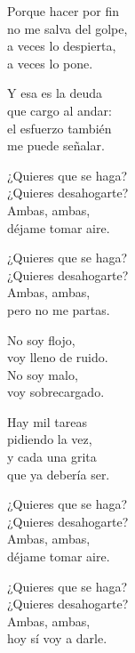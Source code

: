 \begin{lyrics}
Porque hacer por fin\\
no me salva del golpe,\\
a veces lo despierta,\\
a veces lo pone.

Y esa es la deuda\\
que cargo al andar:\\
el esfuerzo también\\
me puede señalar.

¿Quieres que se haga?\\
¿Quieres desahogarte?\\
Ambas, ambas,\\
déjame tomar aire.

¿Quieres que se haga?\\
¿Quieres desahogarte?\\
Ambas, ambas,\\
pero no me partas.

No soy flojo,\\
voy lleno de ruido.\\
No soy malo,\\
voy sobrecargado.

Hay mil tareas\\
pidiendo la vez,\\
y cada una grita\\
que ya debería ser.

¿Quieres que se haga?\\
¿Quieres desahogarte?\\
Ambas, ambas,\\
déjame tomar aire.

¿Quieres que se haga?\\
¿Quieres desahogarte?\\
Ambas, ambas,\\
hoy sí voy a darle.
\end{lyrics}

